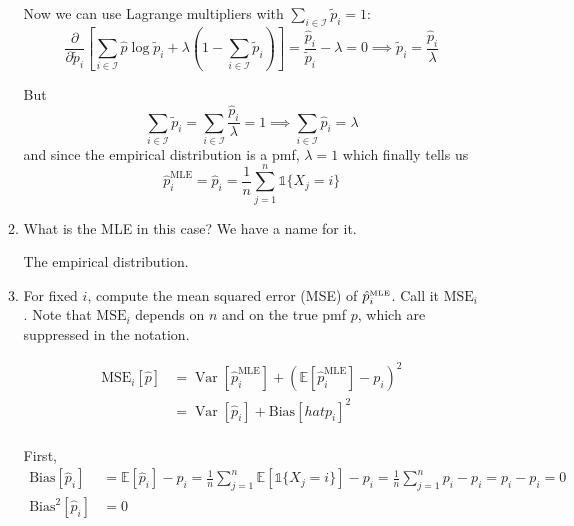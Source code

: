 \documentclass[11pt]{report}
\DeclareMathOperator{\Var}{\text{Var}}
\newcommand{\ind}{{\mathds{1}}}
\newcommand{\E}{\mathbb{E}}
\begin{document}
\begin{enumerate}[1.]
\begin{enumerate}
                    Now we can use Lagrange multipliers with $\sum_{i \in \mathcal I} \tilde p_i = 1$:
                    \[\frac{\partial}{\partial \tilde p_i} \left[\sum_{i \in \mathcal I} \hat p \log \tilde p_i + \lambda(1 - \sum_{i \in \mathcal I} \tilde p_i)\right] = \frac{\hat p_i}{\tilde p_i} - \lambda = 0 \implies \tilde p_i = \frac{\hat p_i}{\lambda}\]

                    But
                    \[\sum_{i \in \mathcal I} \tilde p_i = \sum_{i \in \mathcal I} \frac{\hat p_i}{\lambda} = 1 \implies \sum_{i \in \mathcal I} \hat p_i = \lambda\]
                    and since the empirical distribution is a pmf, $\lambda = 1$ which finally tells us
                    \[\hat p_i^{\text{MLE}} = \hat p_i = \frac{1}{n}\sum_{j=1}^{n} \ind\{X_j = i\}\]

                    \color{black}


              \item What is the MLE in this case? We have a name for it.

                    \color{blue}
                    The empirical distribution.
                    \color{black}

              \item For fixed $i$, compute the mean squared error (MSE) of $\hat p^{\text{\tiny MLE}}_i$. Call it $\text{MSE}_i$. Note that $\text{MSE}_i$ depends on $n$ and on the true pmf $p$, which are suppressed in the notation.

                    \color{blue}
                    \begin{align*}
                        \text{MSE}_i[\hat p] & = \Var[\hat p_i^{\text{MLE}}] + (\E[\hat p_i^{\text{MLE}}] - p_i)^2 \\
                                             & = \Var[\hat p_i] + \text{Bias}[hat p_i]^2                           \\
                    \end{align*}

                    First,
                    \begin{align*}
                        \text{Bias}[\hat p_i]   & = \E[\hat p_i] - p_i
                        = \frac{1}{n}\sum_{j=1}^n \E[\ind\{X_j = i\}] - p_i
                        = \frac{1}{n}\sum_{j=1}^n p_i - p_i
                        = p_i - p_i = 0                                \\
                        \text{Bias}^2[\hat p_i] & = 0
                    \end{align*}


\end{enumerate}
\end{enumerate}
\end{document}
